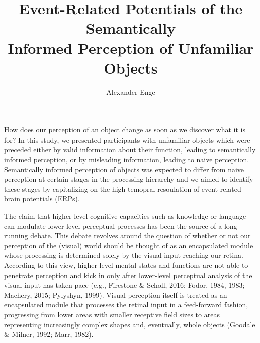 \documentclass[
  english,
  man,12pt,twoside]{apa7}
\title{Event-Related Potentials of the Semantically\\
Informed Perception of Unfamiliar Objects}
\author{Alexander Enge}
\date{}
\affiliation{\vspace{0.5cm}Humboldt-Universität zu Berlin}
\begin{document}
\maketitle

\setcounter{page}{1}

How does our perception of an object change as soon as we discover what it is for? In this study, we presented participants with unfamiliar objects which were preceded either by valid information about their function, leading to semantically informed perception, or by misleading information, leading to naive perception. Semantically informed perception of objects was expected to differ from naive perception at certain stages in the processing hierarchy and we aimed to identify these stages by capitalizing on the high temopral resoulation of event-related brain potentials (ERPs).

The claim that higher-level cognitive capacities such as knowledge or language can modulate lower-level perceptual processes has been the source of a long-running debate. This debate revolves around the question of whether or not our perception of the (visual) world should be thought of as an encapsulated module whose processing is determined solely by the visual input reaching our retina. According to this view, higher-level mental states and functions are not able to penetrate perception and kick in only after lower-level perceptual analysis of the visual input has taken pace (e.g., Firestone \& Scholl, 2016; Fodor, 1984, 1983; Machery, 2015; Pylyshyn, 1999). Visual perception itself is treated as an encapsulated module that processes the retinal input in a feed-forward fashion, progressing from lower areas with smaller receptive field sizes to areas representing increasingly complex shapes and, eventually, whole objects (Goodale \& Milner, 1992; Marr, 1982).
\end{document}
